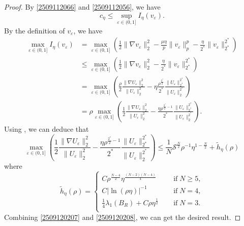 \documentclass[10pt]{article}
\numberwithin{equation}{section}
\numberwithin{equation}{section}
\begin{document}
\begin{proof}
By \eqref{2509112066} and \eqref{2509112056}, we have
\[
c_\eta\le \underset{\varepsilon\in (0, 1]}{\sup}I_\eta(v_\varepsilon).
\]
By the definition of $v_\varepsilon$, we have
\begin{equation}\label{2509120207}
\begin{aligned}
\underset{\varepsilon\in (0, 1]}{\max}I_\eta(v_\varepsilon)&=\underset{\varepsilon\in (0, 1]}{\max} \left(\frac{1}{2}\|\nabla v_\varepsilon\|_2^2-\frac{\mu\eta}{p}\|v_\varepsilon\|_p^p-\frac{\eta}{2^*}\|v_\varepsilon\|_{2^*}^{2^*}\right)\\
&\le\underset{\varepsilon\in (0, 1]}{\max} \left(\frac{1}{2}\|\nabla v_\varepsilon\|_2^2-\frac{\eta}{2^*}\|v_\varepsilon\|_{2^*}^{2^*}\right)\\
&=\underset{\varepsilon\in (0, 1]}{\max} \left(\frac{\rho}{2}\frac{\|\nabla U_\varepsilon\|_2^2}{\| U_\varepsilon\|_2^2}
-\eta\frac{\rho^{\frac{2^*}{2}}}{2^*}\frac{\| U_\varepsilon\|_{2^*}^{2^*}}{\| U_\varepsilon\|_2^{2^*}}\right)\\
&=\rho\underset{\varepsilon\in (0, 1]}{\max} \left(\frac{1}{2}\frac{\|\nabla U_\varepsilon\|_2^2}{\| U_\varepsilon\|_2^2}
-\frac{\eta\rho^{\frac{2^*}{2}-1}}{2^*}\frac{\| U_\varepsilon\|_{2^*}^{2^*}}{\| U_\varepsilon\|_2^{2^*}}\right).
\end{aligned}
\end{equation}
Using \cite[Lemma 3.7]{Pierotti25}, we can deduce that
\begin{equation}\label{2509120208}
\underset{\varepsilon\in (0, 1]}{\max} \left(\frac{1}{2}\frac{\|\nabla U_\varepsilon\|_2^2}{\| U_\varepsilon\|_2^2}
-\frac{\eta\rho^{\frac{2^*}{2}-1}}{2^*}\frac{\| U_\varepsilon\|_{2^*}^{2^*}}{\| U_\varepsilon\|_2^{2^*}}\right)\le \frac{1}{N}{\mathcal{S}}^{\frac{N}{2}}\rho^{-1}\eta^{1-\frac{N}{2}}+\widetilde{h}_\eta(\rho)
\end{equation}
where
\[
\widetilde{h}_\eta(\rho)=
\begin{cases}
C\rho^{\frac{N-4}{2}}\eta^{\frac{(N-2)(N-4)}{4}}\quad\; &\mbox{if}\; N\ge 5,\\
C|\ln{(\rho\eta)}|^{-1}\quad\; &\mbox{if}\; N= 4,\\
\frac{1}{4}\lambda_1(B_R)+C\rho\eta^{\frac12}\quad\; &\mbox{if}\; N=3.\\
\end{cases}
\]
Combining \eqref{2509120207} and \eqref{2509120208}, we can get the desired result.
\end{proof}
\end{document}
